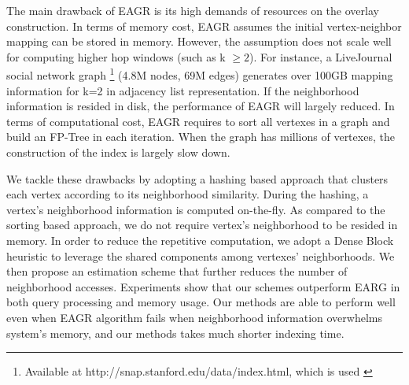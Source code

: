 The main drawback of EAGR is its high demands of resources 
on the overlay construction. In terms of memory cost, EAGR assumes the 
initial vertex-neighbor mapping can be stored in memory. However, the assumption does not scale well for computing higher hop windows (such as k $\geq 2$). 
For instance, a LiveJournal social network graph \footnote{Available at http://snap.stanford.edu/data/index.html, which is used \cite{mondal2014eagr}} (4.8M nodes, 69M edges) generates over 100GB mapping information for k=2 in adjacency list 
representation. If the neighborhood information is resided in disk, the performance of EAGR will
largely reduced.  In terms of computational cost, EAGR requires to sort all vertexes 
in a graph and build an FP-Tree in each iteration. When the graph has
millions of vertexes, the construction of the index is largely slow down.


We tackle these drawbacks by adopting a hashing based approach that clusters each vertex according to
its neighborhood similarity. During the hashing, a vertex's neighborhood information
is computed on-the-fly. As compared to the sorting based approach, we do not require vertex's neighborhood
to be resided in memory. 
In order to reduce the repetitive computation, we adopt a Dense Block heuristic to leverage
the shared components among vertexes' neighborhoods. We then propose an estimation scheme that
further reduces the number of neighborhood accesses.
Experiments show that our schemes outperform EARG in both query processing and memory usage. 
Our methods are able to perform well even when EAGR algorithm fails when neighborhood information overwhelms system's memory, and our methods takes much shorter indexing time.
%
  


